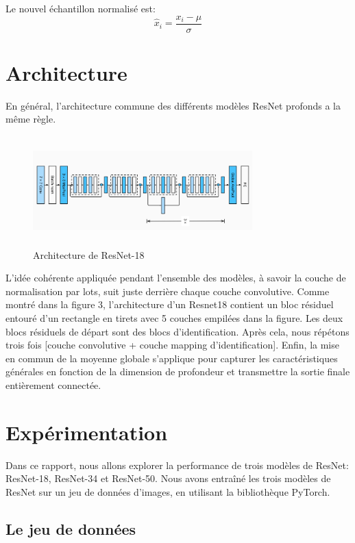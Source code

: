 \documentclass{article}
\begin{document}
Le nouvel échantillon normalisé est:
\begin{equation}
    \hat{x}_{i} = \frac{x_{i} - \mu}{\sigma}
\end{equation}

\section{Architecture}
En général, l'architecture commune des différents modèles ResNet profonds a la même règle.
\begin{figure}[h]
    \centering
    \includegraphics[width=240pt,height=120pt]{./img/model}
    \caption{Architecture de ResNet-18}\label{fig: model}
\end{figure}
L'idée cohérente appliquée pendant l'ensemble des modèles, à savoir la couche de normalisation par lots, suit juste
derrière chaque couche convolutive.
Comme montré dans la figure 3, l'architecture d'un Resnet18 contient un bloc résiduel entouré d'un rectangle en tirets
avec 5 couches empilées dans la figure. Les deux blocs résiduels de départ sont des blocs d'identification. Après cela,
nous répétons trois fois [couche convolutive + couche mapping d'identification]. Enfin, la mise en commun de la moyenne
globale s'applique pour capturer les caractéristiques générales en fonction de la dimension de profondeur et transmettre
la sortie finale entièrement connectée.

\section{Expérimentation}

Dans ce rapport, nous allons explorer la performance de trois modèles de ResNet: ResNet-18, ResNet-34 et ResNet-50.
Nous avons entraîné les trois modèles de ResNet sur un jeu de données d'images, en utilisant la bibliothèque PyTorch.

\subsection{Le jeu de données}
\end{document}
